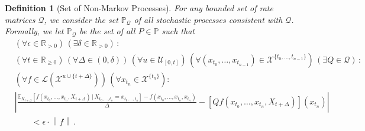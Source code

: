 \documentclass[10pt]{paper}
\newtheorem{definition}{Definition}
\newcommand{\reals}{\mathbb{R}}
\newcommand{\realspos}{\reals_{>0}}
\newcommand{\realsnonneg}{\reals_{\geq 0}}
\newcommand{\states}{\mathcal{X}}
\newcommand{\processes}{\mathbb{P}}
\newcommand{\gambles}{\mathcal{L}}
\newcommand{\rateset}{\mathcal{Q}}
\newcommand{\norm}[1]{\left\lVert #1 \right\rVert}
\newcommand{\abs}[1]{\left\vert #1 \right\vert}
\begin{document}
\begin{definition}[Set of Non-Markov Processes]\label{def:set_non_markov_process}
For any bounded set of rate matrices $\rateset$, we consider the set $\processes_\rateset$ of all stochastic processes \emph{consistent} with $\rateset$. Formally, we let $\processes_\rateset$ be the set of all $P\in\processes$ such that
\begin{align*}
&(\forall\epsilon\in\realspos)\,(\exists\delta\in\realspos)\,: \\
 &(\forall t\in\realsnonneg)\,(\forall\Delta\in(0,\delta))\,(\forall u\in\mathcal{U}_{[0,t]})\,(\forall(x_{t_0},\ldots,x_{t_{n-1}})\in\states^{\{t_0,\ldots,t_{n-1}\}})\,(\exists Q\in\rateset)\,: \\
 &(\forall f\in\gambles(\states^{u\cup\{t+\Delta\}}))\,(\forall x_{t_n}\in\states^{\{t_n\}}): \\
 &\abs{\frac{\mathbb{E}_{X_{t+\Delta}}[f(x_{t_0},\ldots,x_{t_n},X_{t+\Delta})\,\vert\,X_{t_0,\ldots,t_n}=x_{t_0,\ldots,t_n}] - f(x_{t_0},\ldots,x_{t_n},x_{t_n})}{\Delta} - \left[Q f(x_{t_0},\ldots,x_{t_{n}},X_{t+\Delta})\right](x_{t_n})} \\ 
 &\quad\quad < \epsilon\cdot\norm{f}\,.
\end{align*}
\end{definition}
\end{document}
